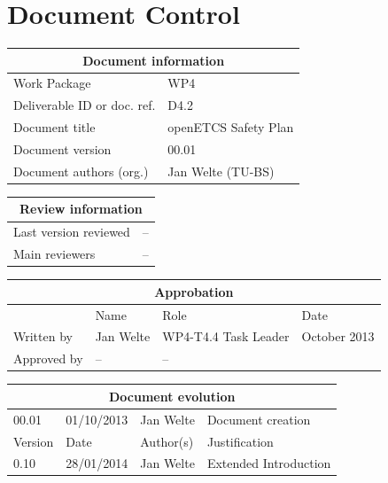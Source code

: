 \documentclass{template/openetcs_report}
\begin{document}
\chapter{Document Control}

\begin{tabular}{|p{4.4cm}|p{8.7cm}|}
\hline
\multicolumn{2}{|c|}{Document information} \\
\hline
Work Package &  WP4  \\
Deliverable ID or doc. ref. & D4.2\\
\hline
Document title & openETCS Safety Plan\\
Document version & 00.01 \\
Document authors (org.)  & Jan Welte (TU-BS)\\
\hline
\end{tabular}

\begin{tabular}{|p{4.4cm}|p{8.7cm}|}
\hline
\multicolumn{2}{|c|}{Review information} \\
\hline
Last version reviewed & -- \\
\hline
Main reviewers & -- \\
\hline
\end{tabular}

\begin{tabular}{|p{2.2cm}|p{4cm}|p{4cm}|p{2cm}|}
\hline
\multicolumn{4}{|c|}{Approbation} \\
\hline
  &  Name & Role & Date   \\
\hline  
Written by    &  Jan Welte & WP4-T4.4 Task Leader  &  October 2013\\
\hline
Approved by & -- & -- & \\
\hline
\end{tabular}

\begin{tabular}{|p{2.2cm}|p{2cm}|p{3cm}|p{5cm}|}
\hline
\multicolumn{4}{|c|}{Document evolution} \\
\hline
00.01 & 01/10/2013 & Jan Welte &  Document creation \\
\hline
Version &  Date & Author(s) & Justification  \\
\hline  
0.10 & 28/01/2014 & Jan Welte &  Extended Introduction  \\
\hline  
\end{tabular}
\newpage


\mainmatter
\end{document}
